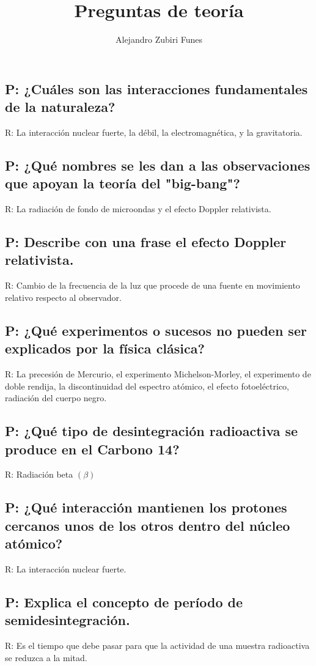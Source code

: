 \documentclass{article}
\title{Preguntas de teoría}
\author{Alejandro Zubiri Funes}
\date{}
\begin{document}
\maketitle
\subsection*{P: ¿Cuáles son las interacciones fundamentales de la naturaleza?}
R: La interacción nuclear fuerte, la débil, la electromagnética, y la gravitatoria.

\subsection*{P: ¿Qué nombres se les dan a las observaciones que apoyan la teoría del "big-bang"?}
R: La radiación de fondo de microondas y el efecto Doppler relativista.

\subsection*{P: Describe con una frase el efecto Doppler relativista.}
R: Cambio de la frecuencia de la luz que procede de una fuente en movimiento relativo respecto al observador.

\subsection*{P: ¿Qué experimentos o sucesos no pueden ser explicados por la física clásica?}
R: La precesión de Mercurio, el experimento Michelson-Morley, el experimento de doble rendija, la discontinuidad del espectro atómico, el efecto fotoeléctrico, radiación del cuerpo negro.

\subsection*{P: ¿Qué tipo de desintegración radioactiva se produce en el Carbono 14?}
R: Radiación beta $(\beta)$

\subsection*{P: ¿Qué interacción mantienen los protones cercanos unos de los otros dentro del núcleo atómico?}
R: La interacción nuclear fuerte.

\subsection*{P: Explica el concepto de período de semidesintegración.}
R: Es el tiempo que debe pasar para que la actividad de una muestra radioactiva se reduzca a la mitad.
\end{document}

